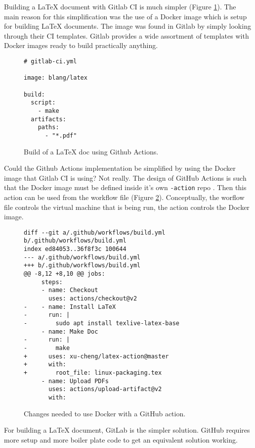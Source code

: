 \documentclass{article}
\begin{document}
Building a LaTeX document with Gitlab CI is much simpler
(Figure
\ref{fig:gitlab-ci-build})\autocite{gitlab-jmmahler-resume-gitlab-ci.yml}\autocite{gitlab-resume-build-533777462}.
The main reason for this simplification was the use of a
Docker image which is setup for building LaTeX documents.
The image was found in Gitlab by simply looking through their CI
templates.
Gitlab provides a wide assortment of templates with Docker images
ready to build practically anything.

\begin{figure}[!ht]
\begin{lstlisting}
# gitlab-ci.yml

image: blang/latex

build:
  script:
    - make
  artifacts:
    paths:
      - "*.pdf"
\end{lstlisting}
\label{fig:gitlab-ci-build}
\caption{Build of a LaTeX doc using Github Actions.}
\end{figure}

Could the Github Actions implementation be simplified by using the
Docker image that Gitlab CI is using?
Not really.
The design of GitHub Actions is such that the Docker image must be
defined inside it's own \verb+-action+ repo
\autocite{github-action-docker}.
Then this action can be used from the workflow file
(Figure \ref{fig:github-action-with-docker}).
Conceptually, the worflow file controls the virtual machine that
is being run, the action controls the Docker image.

\begin{figure}[!ht]
\begin{lstlisting}
diff --git a/.github/workflows/build.yml b/.github/workflows/build.yml
index ed84053..36f8f3c 100644
--- a/.github/workflows/build.yml
+++ b/.github/workflows/build.yml
@@ -8,12 +8,10 @@ jobs:
     steps:
     - name: Checkout
       uses: actions/checkout@v2
-    - name: Install LaTeX
-      run: |
-        sudo apt install texlive-latex-base
     - name: Make Doc
-      run: |
-        make
+      uses: xu-cheng/latex-action@master
+      with:
+        root_file: linux-packaging.tex
     - name: Upload PDFs
       uses: actions/upload-artifact@v2
       with:
\end{lstlisting}
\label{fig:github-action-with-docker}
\caption{Changes needed to use Docker with a GitHub action.}
\end{figure}

For building a LaTeX document, GitLab is the simpler solution.
GitHub requires more setup and more boiler plate code to get
an equivalent solution working.

\clearpage
\printbibliography[heading=bibintoc]
\end{document}
